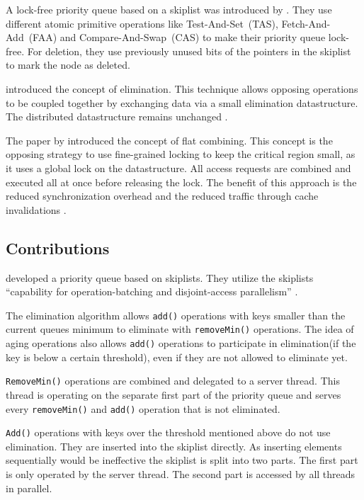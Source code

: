 A lock-free priority queue based on a skiplist was introduced by \citeauthor{sundell_fast_2003}. They use different atomic primitive operations like Test-And-Set~(TAS), Fetch-And-Add~(FAA) and Compare-And-Swap~(CAS) to make their priority queue lock-free. For deletion, they use previously unused bits of the pointers in the skiplist to mark the node as deleted\cite{sundell_fast_2003}.

\citeauthor{shavit_elimination_1997} introduced the concept of elimination. This technique allows opposing operations to be coupled together by exchanging data via a small elimination datastructure. The distributed datastructure remains unchanged \cite{shavit_elimination_1997}.

The paper by \citeauthor{hendler_flat_2010} introduced the concept of flat combining. This concept is the opposing strategy to use fine-grained locking to keep the critical region small, as it uses a global lock on the datastructure. All access requests are combined and executed all at once before releasing the lock. The benefit of this approach is the reduced synchronization overhead and the reduced traffic through cache invalidations \cite{hendler_flat_2010}.

\subsection{Contributions}

\citeauthor{calciu_adaptive_2014} developed a priority queue based on skiplists. They utilize the skiplists \enquote{capability for operation-batching and disjoint-access parallelism} \cite[407]{calciu_adaptive_2014}.

The elimination algorithm allows \texttt{add()} operations with keys smaller than the current queues minimum to eliminate with \texttt{removeMin()} operations. The idea of aging operations also allows \texttt{add()} operations to participate in elimination(if the key is below a certain threshold), even if they are not allowed to eliminate yet.

\texttt{RemoveMin()} operations are combined and delegated to a server thread. This thread is operating on the separate first part of the priority queue and serves every \texttt{removeMin()} and \texttt{add()} operation that is not eliminated.

\texttt{Add()} operations with keys over the threshold mentioned above do not use elimination. They are inserted into the skiplist directly. As inserting elements sequentially would be ineffective the skiplist is split into two parts. The first part is only operated by the server thread. The second part is accessed by all threads in parallel.

